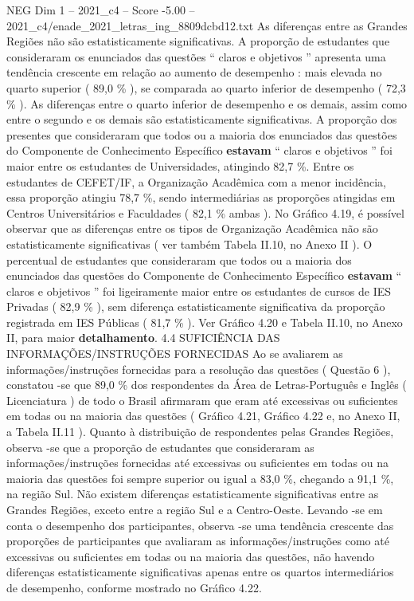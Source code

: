 \begin{textsample}{NEG Dim 1 – 2021\_c4 – Score -5.00 – 2021\_c4/enade\_2021\_letras\_ing\_8809dcbd12.txt}
As diferenças entre as Grandes Regiões não são estatisticamente significativas.
A proporção de estudantes que consideraram os enunciados das questões “ claros e objetivos ” apresenta uma tendência crescente em relação ao aumento de desempenho : mais elevada no quarto superior ( 89,0 \% ), se comparada ao quarto inferior de desempenho ( 72,3 \% ).
As diferenças entre o quarto inferior de desempenho e os demais, assim como entre o segundo e os demais são estatisticamente significativas.
A proporção dos presentes que consideraram que todos ou a maioria dos enunciados das questões do Componente de Conhecimento Específico \textbf{estavam} “ claros e objetivos ” foi maior entre os estudantes de Universidades, atingindo 82,7 \%.
Entre os estudantes de CEFET/IF, a Organização Acadêmica com a menor incidência, essa proporção atingiu 78,7 \%, sendo intermediárias as proporções atingidas em Centros Universitários e Faculdades ( 82,1 \% ambas ).
No Gráfico 4.19, é possível observar que as diferenças entre os tipos de Organização Acadêmica não são estatisticamente significativas ( ver também Tabela II.10, no Anexo II ).
O percentual de estudantes que consideraram que todos ou a maioria dos enunciados das questões do Componente de Conhecimento Específico \textbf{estavam} “ claros e objetivos ” foi ligeiramente maior entre os estudantes de cursos de IES Privadas ( 82,9 \% ), sem diferença estatisticamente significativa da proporção registrada em IES Públicas ( 81,7 \% ).
Ver Gráfico 4.20 e Tabela II.10, no Anexo II, para maior \textbf{detalhamento}. 4.4 SUFICIÊNCIA DAS INFORMAÇÕES/INSTRUÇÕES FORNECIDAS Ao se avaliarem as informações/instruções fornecidas para a resolução das questões ( Questão 6 ), constatou -se que 89,0 \% dos respondentes da Área de Letras-Português e Inglês ( Licenciatura ) de todo o Brasil afirmaram que eram até excessivas ou suficientes em todas ou na maioria das questões ( Gráfico 4.21, Gráfico 4.22 e, no Anexo II, a Tabela II.11 ).
Quanto à distribuição de respondentes pelas Grandes Regiões, observa -se que a proporção de estudantes que consideraram as informações/instruções fornecidas até excessivas ou suficientes em todas ou na maioria das questões foi sempre superior ou igual a 83,0 \%, chegando a 91,1 \%, na região Sul.
Não existem diferenças estatisticamente significativas entre as Grandes Regiões, exceto entre a região Sul e a Centro-Oeste.
Levando -se em conta o desempenho dos participantes, observa -se uma tendência crescente das proporções de participantes que avaliaram as informações/instruções como até excessivas ou suficientes em todas ou na maioria das questões, não havendo diferenças estatisticamente significativas apenas entre os quartos intermediários de desempenho, conforme mostrado no Gráfico 4.22.

\end{textsample}
